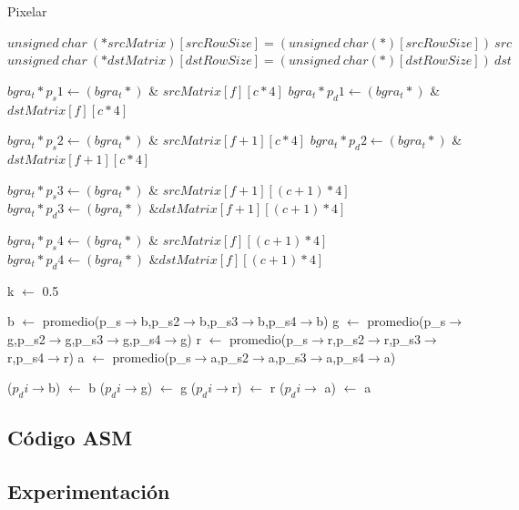 	\begin{algorithm}[h!]
\caption{Pixelar}
\begin{algorithmic}
	\State $unsigned~ char~ (*srcMatrix)[srcRowSize] = (unsigned~ char (*)[srcRowSize])~ src$
	\State $unsigned~ char~ (*dstMatrix)[dstRowSize] = (unsigned~ char (*)[dstRowSize])~ dst$
	
			\State $bgra_t* p_s1 \gets (bgra_t*)$ \& $srcMatrix[f][c * 4]$
			\State $bgra_t *p_d1 \gets (bgra_t*)$ \&$dstMatrix[f][c * 4]$
			
			\State $bgra_t* p_s2 \gets (bgra_t*)$ \& $srcMatrix[f+1][c * 4]$
			\State $bgra_t *p_d2 \gets (bgra_t*)$ \&$dstMatrix[f+1][c * 4]$
			
			\State $bgra_t* p_s3 \gets (bgra_t*)$ \& $srcMatrix[f+1][(c+1) * 4]$
			\State $bgra_t *p_d3 \gets (bgra_t*)$ \&$dstMatrix[f+1][(c+1) * 4]$
			
			\State $bgra_t* p_s4 \gets (bgra_t*)$ \& $srcMatrix[f][(c+1) * 4]$
			\State $bgra_t *p_d4 \gets (bgra_t*)$ \&$dstMatrix[f][(c+1) * 4]$
			
			\State k $\gets$ 0.5
			
			\State b $\gets$ promedio(p_s$\rightarrow$b,p_s2$\rightarrow$b,p_s3$\rightarrow$b,p_s4$\rightarrow$b)
			\State g $\gets$ promedio(p_s$\rightarrow$g,p_s2$\rightarrow$g,p_s3$\rightarrow$g,p_s4$\rightarrow$g)
			\State r $\gets$ promedio(p_s$\rightarrow$r,p_s2$\rightarrow$r,p_s3$\rightarrow$r,p_s4$\rightarrow$r)
			\State a $\gets$ promedio(p_s$\rightarrow$a,p_s2$\rightarrow$a,p_s3$\rightarrow$a,p_s4$\rightarrow$a)
				
				\State ($p_di \rightarrow$b) $\gets$ b
				\State ($p_di \rightarrow$g) $\gets$ g
				\State ($p_di \rightarrow$r) $\gets$ r
				\State ($p_di \rightarrow$ a) $\gets$ a
				
			
		\EndFor
	\EndFor
\EndFunction

\end{algorithmic} 
\end{algorithm}
\subsection{Código ASM}
	
	
	
\subsection{Experimentación}
